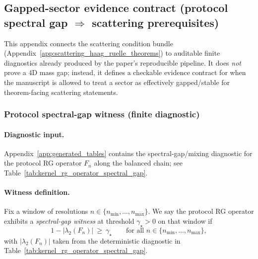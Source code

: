 \subsection{Gapped-sector evidence contract (protocol spectral gap $\Rightarrow$ scattering prerequisites)}
\label{app:gapped_sector_evidence_contract}

\AuditTag This appendix connects the scattering condition bundle (Appendix~\ref{app:scattering_haag_ruelle_theorems}) to auditable finite diagnostics already produced by the paper's reproducible pipeline.
It does \emph{not} prove a 4D mass gap; instead, it defines a checkable evidence contract for when the manuscript is allowed to treat a sector as effectively gapped/stable for theorem-facing scattering statements.

\subsubsection{Protocol spectral-gap witness (finite diagnostic)}
\paragraph{Diagnostic input.}
Appendix~\ref{app:generated_tables} contains the spectral-gap/mixing diagnostic for the protocol RG operator $F_n$ along the balanced chain; see Table~\ref{tab:kernel_rg_operator_spectral_gap}.

\paragraph{Witness definition.}
\begin{definition}
\label{def:protocol_spectral_gap_witness}
\MathTag Fix a window of resolutions $n\in\{n_{\min},\dots,n_{\max}\}$.
We say the protocol RG operator exhibits a \emph{spectral-gap witness} at threshold $\gamma_\star>0$ on that window if
\[
1-|\lambda_2(F_n)|\ \ge\ \gamma_\star
\qquad\text{for all }n\in\{n_{\min},\dots,n_{\max}\},
\]
with $|\lambda_2(F_n)|$ taken from the deterministic diagnostic in Table~\ref{tab:kernel_rg_operator_spectral_gap}.
\end{definition}

